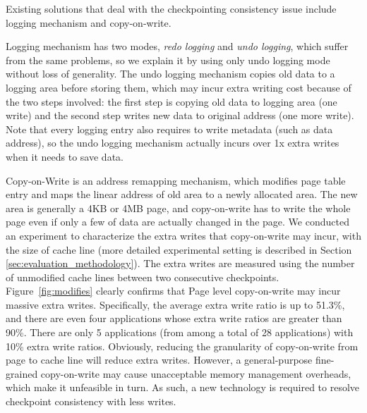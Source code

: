 \documentclass[conference]{IEEEtran}
\begin{document}
Existing solutions that deal with the checkpointing consistency issue include logging mechanism and copy-on-write.

Logging mechanism has two modes, \emph{redo logging} and \emph{undo logging}, which suffer from the same problems, so we explain it by using only undo logging mode without loss of generality.
The undo logging mechanism copies old data to a logging area before storing them, which may incur extra writing cost because of the two steps involved: the first step is copying old data to logging area (one write) and the second step writes new data to original address (one more write).
Note that every logging entry also requires to write metadata (such as data address), so the undo logging mechanism actually incurs over 1x extra writes when it needs to save data.

Copy-on-Write is an address remapping mechanism, which modifies page table entry and maps the linear address of old area to a newly allocated area.
The new area is generally a 4KB or 4MB page, and copy-on-write has to write the whole page even if only a few of data are actually changed in the page.
We conducted an experiment to characterize the extra writes that copy-on-write may incur, with the size of cache line (more detailed experimental setting is described in Section \ref{sec:evaluation_methodology}). The extra writes are measured using the number of unmodified cache lines between two consecutive checkpoints.
Figure~\ref{fig:modifies} clearly confirms that Page level copy-on-write may incur massive extra writes. Specifically, the average extra write ratio is up to 51.3\%, and there are even four applications whose extra write ratios are greater than 90\%.
There are only 5 applications (from among a total of 28 applications) with 10\% extra write ratios. Obviously, reducing the granularity of copy-on-write from page to cache line will reduce extra writes. However, a general-purpose fine-grained copy-on-write may cause unacceptable memory management overheads, which make it unfeasible in turn. As such, a new technology is required to resolve checkpoint consistency with less writes. %
\end{document}
